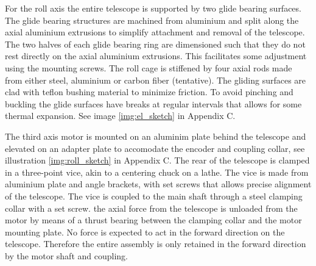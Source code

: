 For the roll axis the entire telescope is supported by two glide bearing surfaces. The glide bearing structures are machined from  aluminium and split along the axial aluminium extrusions to simplify attachment and removal of the telescope. The  two halves of each glide bearing ring are dimensioned such that they do not rest directly on the axial aluminium extrusions. This facilitates some adjustment using the mounting screws. The roll cage is stiffened by four axial rods made from either steel, aluminium or carbon fiber (tentative). The gliding surfaces are clad with teflon bushing material to minimize friction. To avoid pinching and buckling the glide surfaces have breaks at regular intervals that allows for some thermal expansion. See image \ref{img:el_sketch} in Appendix C. 

The third axis motor is mounted on an aluminim plate behind the telescope and elevated on an adapter plate to accomodate the encoder and coupling collar, see illustration \ref{img:roll_sketch} in Appendix C. The rear of the telescope is clamped in a three-point vice, akin to a centering chuck on a lathe. The vice is made from aluminium plate and angle brackets, with set screws that allows precise alignment of the telescope. The vice is coupled to the main shaft through a steel clamping collar with a set screw. the axial force from the telescope is unloaded from the motor by means of a thrust bearing between the clamping collar and the motor mounting plate. No force is expected to act in the forward direction on the telescope. Therefore the entire assembly is only retained in the forward direction by the motor shaft and coupling. 

